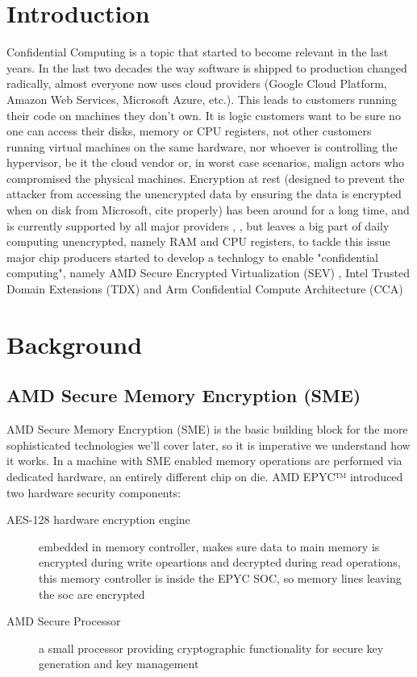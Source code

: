 \documentclass[twocolumn]{article}
\begin{document}
\section{Introduction}
Confidential Computing is a topic that started to become relevant in the last years. In the last two decades the way software is shipped to production changed radically, almost everyone now uses cloud providers (Google Cloud Platform, Amazon Web Services, Microsoft Azure, etc.). This leads to customers running their code on machines they don't own. It is logic customers want to be sure no one can access their disks, memory or CPU registers, not other customers running virtual machines on the same hardware, nor whoever is controlling the hypervisor, be it  the cloud vendor  or, in worst case scenarios, malign actors who compromised the physical machines. Encryption at rest (designed to prevent the attacker from accessing the unencrypted data by ensuring the data is encrypted when on disk from Microsoft, cite properly) has been around for a long time, and is currently supported by all major providers \cite{aws-enc}, \cite{gcp-enc}, \cite{azure-enc} but leaves a big part of daily computing unencrypted, namely RAM and CPU registers, to tackle this issue major chip producers started to develop a technlogy to enable "confidential computing", namely AMD Secure Encrypted Virtualization (SEV) \cite{memory-encryption}, Intel Trusted Domain Extensions (TDX) \cite{tdx} and Arm Confidential Compute Architecture (CCA) \cite{cca}
\section{Background}


\subsection{AMD Secure Memory Encryption (SME)}
    AMD Secure Memory Encryption (SME) is the basic building block for the more sophisticated technologies we'll cover later, so it is imperative we understand how it works. In a machine with SME enabled memory operations are performed via dedicated hardware, an entirely different chip on die. AMD EPYC™ introduced two hardware security components:
    \begin{description}
        \item [AES-128 hardware encryption engine] embedded in memory controller, makes sure data to main memory is encrypted during write opeartions and decrypted during read operations, this memory controller is inside the EPYC SOC, so memory lines leaving the soc are encrypted
        \item [AMD Secure Processor] a small processor providing cryptographic functionality for secure key generation and key management
    \end{description}
\end{document}
